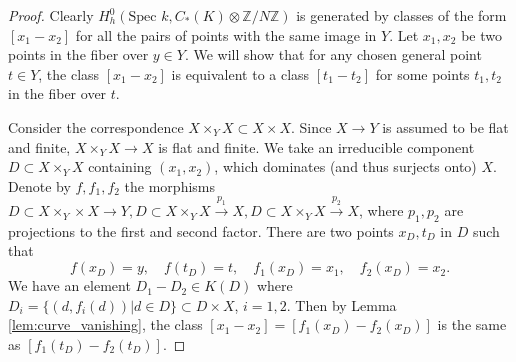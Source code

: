 \documentclass{amsart}
\theoremstyle{definition}
\theoremstyle{remark}
\newcommand{\mbb}{\mathbb}
\newcommand{\ZZ}{\mbb{Z}}
\newcommand{\SP}{\text{Spec }}
\begin{document}
\begin{proof}
Clearly $H_h^{0}(\SP k, C_*(K)\otimes \ZZ/N\ZZ)$ is generated by classes of the form $[x_1-x_2]$ for all the pairs of points with the same image in $Y$.
Let $x_1, x_2$ be two points in the fiber over $y \in Y$.
We will show that for any chosen general point $t \in Y$, the class $[x_1-x_2]$ is equivalent to a class $[t_1-t_2]$ for some points $t_1, t_2$ in the fiber over $t$. 

Consider the correspondence $X \times_Y X\subset X \times X$.
Since $X \to Y$ is assumed to be flat and finite, $X \times_Y X \to X$ is flat and finite.
We take an irreducible component $D \subset X\times_Y X$ containing $(x_1, x_2)$, which dominates (and thus surjects onto) $X$. 
 Denote by $f, f_1, f_2$ the morphisms $D \subset X \times_Y \times X \to Y, D \subset X \times_Y X \xrightarrow{p_1} X, D \subset X \times_Y X \xrightarrow{p_2} X$, where $p_1, p_2$ are projections to the first and second factor.
 There are two points $x_D, t_D$ in $D$ such that \[
 f(x_D)=y,\quad f(t_D)=t,\quad f_1(x_D)=x_1,\quad f_2(x_D)=x_2.
 \] 
 We have an element $D_1-D_2\in K(D)$ where $D_i=\{(d, f_i(d))| d \in D\}\subset D \times X$, $i=1, 2$.
Then by Lemma \ref{lem:curve_vanishing}, the class $[x_1-x_2]=[f_1(x_D)-f_2(x_D)]$ is the same  as $[f_1(t_D)-f_2(t_D)]$.
\end{proof}
\end{document}
